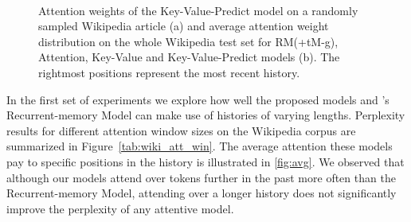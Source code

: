 \documentclass{article}
\begin{document}
\begin{figure}[t!]
\centering
{}\\
\centering
{}
\caption{Attention weights of the Key-Value-Predict model on a randomly sampled Wikipedia article (a) and average attention weight distribution on the whole Wikipedia test set for RM(+tM-g), Attention, Key-Value and Key-Value-Predict models (b). The rightmost positions represent the most recent history. }
\label{fig:avg}
\end{figure}

In the first set of experiments we explore how well the proposed models and \citeauthor{tran2016recurrent}'s Recurrent-memory Model can make use of histories of varying lengths. 
Perplexity results for different attention window sizes on the Wikipedia corpus are summarized in Figure~\ref{tab:wiki_att_win}.
The average attention these models pay to specific positions in the history is illustrated in  \autoref{fig:avg}.
We observed that although our models attend over tokens further in the past more often than the Recurrent-memory Model, attending over a longer history does not significantly improve the perplexity of any attentive model. 
\end{document}
